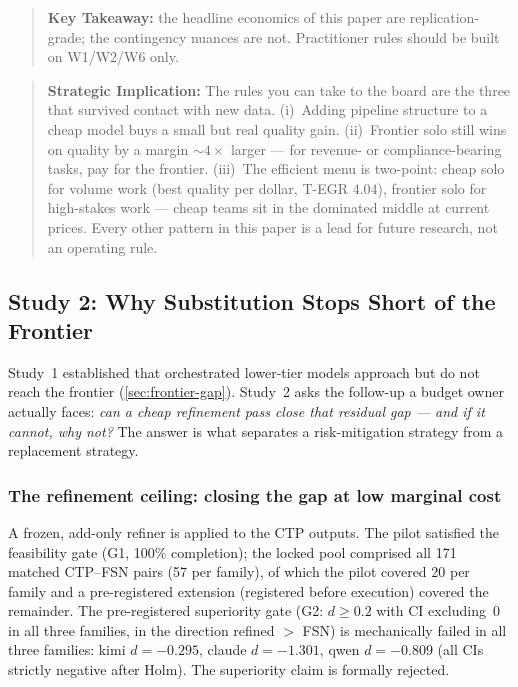 \documentclass[12pt,a4paper]{article}
\begin{document}
\begin{quote}
\textbf{Key Takeaway:} the headline economics of this paper are
replication-grade; the contingency nuances are not. Practitioner rules should
be built on W1/W2/W6 only.
\end{quote}

\begin{quote}
\textbf{Strategic Implication:} The rules you can take to the board are the
three that survived contact with new data. (i)~Adding pipeline structure to a
cheap model buys a small but real quality gain. (ii)~Frontier solo still wins
on quality by a margin $\sim 4\times$ larger --- for revenue- or
compliance-bearing tasks, pay for the frontier. (iii)~The efficient menu is
two-point: cheap solo for volume work (best quality per dollar, T-EGR
$4.04$), frontier solo for high-stakes work --- cheap teams sit in the
dominated middle at current prices. Every other pattern in this paper is a
lead for future research, not an operating rule.
\end{quote}

\subsection{Study 2: Why Substitution Stops Short of the Frontier}\label{sec:study2}

Study~1 established that orchestrated lower-tier models approach but do not
reach the frontier (\cref{sec:frontier-gap}). Study~2 asks the follow-up a
budget owner actually faces: \emph{can a cheap refinement pass close that
residual gap --- and if it cannot, why not?} The answer is what separates a
risk-mitigation strategy from a replacement strategy.

\subsubsection{The refinement ceiling: closing the gap at low marginal cost}\label{sec:refinement}

A frozen, add-only refiner is applied to the CTP outputs. The pilot satisfied
the feasibility gate (G1, 100\% completion); the locked pool comprised all 171
matched CTP--FSN pairs (57 per family), of which the pilot covered 20 per
family and a pre-registered extension (registered before execution) covered
the remainder. The pre-registered superiority gate (G2: $d \ge 0.2$ with CI
excluding~0 in all three families, in the direction refined $>$ FSN) is
mechanically failed in all three families: kimi $d = -0.295$, claude $d =
-1.301$, qwen $d = -0.809$ (all CIs strictly negative after Holm). The
superiority claim is formally rejected.
\end{document}
